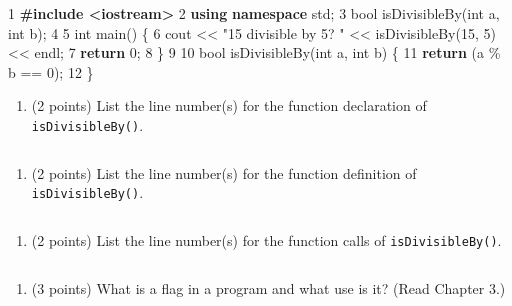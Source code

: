 \documentclass[
]{article}
\newenvironment{Shaded}{}{}
\newcommand{\ControlFlowTok}[1]{\textcolor[rgb]{0.00,0.44,0.13}{\textbf{#1}}}
\newcommand{\DataTypeTok}[1]{\textcolor[rgb]{0.56,0.13,0.00}{#1}}
\newcommand{\DecValTok}[1]{\textcolor[rgb]{0.25,0.63,0.44}{#1}}
\newcommand{\ErrorTok}[1]{\textcolor[rgb]{1.00,0.00,0.00}{\textbf{#1}}}
\newcommand{\KeywordTok}[1]{\textcolor[rgb]{0.00,0.44,0.13}{\textbf{#1}}}
\newcommand{\NormalTok}[1]{#1}
\newcommand{\StringTok}[1]{\textcolor[rgb]{0.25,0.44,0.63}{#1}}
\providecommand{\tightlist}{%
  \setlength{\itemsep}{0pt}\setlength{\parskip}{0pt}}
\begin{document}
\begin{Shaded}
\begin{Highlighting}[]
\DecValTok{1}  \ErrorTok{\#include \textless{}iostream\textgreater{}}
\DecValTok{2}  \KeywordTok{using} \KeywordTok{namespace}\NormalTok{ std;}
\DecValTok{3}  \DataTypeTok{bool}\NormalTok{ isDivisibleBy(}\DataTypeTok{int}\NormalTok{ a, }\DataTypeTok{int}\NormalTok{ b);}
\DecValTok{4}
\DecValTok{5}  \DataTypeTok{int}\NormalTok{ main() \{}
\DecValTok{6}\NormalTok{      cout \textless{}\textless{} }\StringTok{"15 divisible by 5? "}\NormalTok{ \textless{}\textless{} isDivisibleBy(}\DecValTok{15}\NormalTok{, }\DecValTok{5}\NormalTok{) \textless{}\textless{} endl;}
\DecValTok{7}      \ControlFlowTok{return} \DecValTok{0}\NormalTok{;}
\DecValTok{8}\NormalTok{  \}}
\DecValTok{9}
\DecValTok{10} \DataTypeTok{bool}\NormalTok{ isDivisibleBy(}\DataTypeTok{int}\NormalTok{ a, }\DataTypeTok{int}\NormalTok{ b) \{}
\DecValTok{11}     \ControlFlowTok{return}\NormalTok{ (a \% b == }\DecValTok{0}\NormalTok{);}
\DecValTok{12}\NormalTok{ \}}
\end{Highlighting}
\end{Shaded}

\begin{enumerate}
\def\labelenumi{\alph{enumi}.}
\tightlist
\item
  (2 points) List the line number(s) for the function declaration of
  \texttt{isDivisibleBy()}.
\end{enumerate}

\begin{verbatim}
\end{verbatim}

\begin{enumerate}
\def\labelenumi{\alph{enumi}.}
\setcounter{enumi}{1}
\tightlist
\item
  (2 points) List the line number(s) for the function definition of
  \texttt{isDivisibleBy()}.
\end{enumerate}

\begin{verbatim}
\end{verbatim}

\begin{enumerate}
\def\labelenumi{\alph{enumi}.}
\setcounter{enumi}{2}
\tightlist
\item
  (2 points) List the line number(s) for the function calls of
  \texttt{isDivisibleBy()}.
\end{enumerate}

\begin{verbatim}
\end{verbatim}

\begin{enumerate}
\def\labelenumi{\arabic{enumi}.}
\setcounter{enumi}{7}
\tightlist
\item
  (3 points) What is a flag in a program and what use is it? (Read
  Chapter 3.)
\end{enumerate}

\begin{verbatim}




\end{verbatim}
\end{document}
